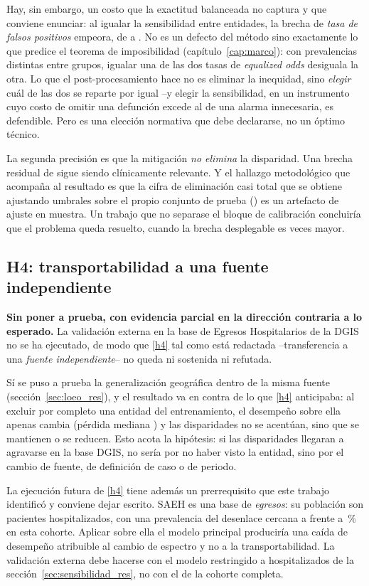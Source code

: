 Hay, sin embargo, un costo que la exactitud balanceada no captura y que conviene
enunciar: al igualar la sensibilidad entre entidades, la brecha de \emph{tasa de
falsos positivos} empeora, de \postGapFPRbase{} a \postGapFPR. No es un defecto
del método sino exactamente lo que predice el teorema de imposibilidad
(capítulo~\ref{cap:marco}): con prevalencias distintas entre grupos, igualar una
de las dos tasas de \emph{equalized odds} desiguala la otra. Lo que el
post-procesamiento hace no es eliminar la inequidad, sino \emph{elegir} cuál de
las dos se reparte por igual --y elegir la sensibilidad, en un instrumento cuyo
costo de omitir una defunción excede al de una alarma innecesaria, es defendible.
Pero es una elección normativa que debe declararse, no un óptimo técnico.

La segunda precisión es que la mitigación \emph{no elimina} la disparidad. Una
brecha residual de \gapPost{} sigue siendo clínicamente relevante. Y el hallazgo
metodológico que acompaña al resultado es que la cifra de eliminación casi total
que se obtiene ajustando umbrales sobre el propio conjunto de prueba
(\gapPostOpt) es un artefacto de ajuste en muestra. Un trabajo que no separase el
bloque de calibración concluiría que el problema queda resuelto, cuando la brecha
desplegable es \factorOptimismo{} veces mayor.

\subsection*{H4: transportabilidad a una fuente independiente}

\textbf{Sin poner a prueba, con evidencia parcial en la dirección contraria a lo
esperado.} La validación externa en la base de Egresos Hospitalarios de la DGIS no
se ha ejecutado, de modo que \ref{h4} tal como está redactada --transferencia a
una \emph{fuente independiente}-- no queda ni sostenida ni refutada.

Sí se puso a prueba la generalización geográfica dentro de la misma fuente
(sección~\ref{sec:loeo_res}), y el resultado va en contra de lo que \ref{h4}
anticipaba: al excluir por completo una entidad del entrenamiento, el desempeño
sobre ella apenas cambia (pérdida mediana \loeoMediana) y las disparidades no se
acentúan, sino que se mantienen o se reducen. Esto acota la hipótesis: si las
disparidades llegaran a agravarse en la base DGIS, no sería por no haber visto la
entidad, sino por el cambio de fuente, de definición de caso o de periodo.

La ejecución futura de \ref{h4} tiene además un prerrequisito que este trabajo
identificó y conviene dejar escrito. SAEH es una base de \emph{egresos}: su
población son pacientes hospitalizados, con una prevalencia del desenlace cercana
a \hospPrev{} frente a \cohorteTasaDef\,\% en esta cohorte. Aplicar sobre ella el
modelo principal produciría una caída de desempeño atribuible al cambio de
espectro y no a la transportabilidad. La validación externa debe hacerse con el
modelo restringido a hospitalizados de la sección~\ref{sec:sensibilidad_res}, no
con el de la cohorte completa.

